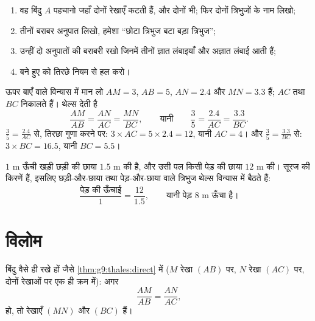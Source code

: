 \begin{method}[थेल्स से कोई लंबाई निकालना]\label{met:g9:thales:compute}
\begin{enumerate}
  \item वह बिंदु $A$ पहचानो जहाँ दोनों रेखाएँ कटती हैं, और दोनों
         भी; फिर दोनों त्रिभुजों के नाम लिखो;
  \item तीनों बराबर अनुपात लिखो, हमेशा ``छोटा त्रिभुज बटा बड़ा
        त्रिभुज'';
  \item उन्हीं दो अनुपातों की बराबरी रखो जिनमें तीनों ज्ञात लंबाइयाँ
        और अज्ञात लंबाई आती हैं;
  \item बने हुए  को तिरछे नियम से हल करो।
\end{enumerate}
\end{method}

\begin{example}\label{ex:g9:thales:compute}
ऊपर बाएँ वाले विन्यास में मान लो $AM = 3$, $AB = 5$, $AN = 2.4$ और
$MN = 3.3$ हैं; $AC$ तथा $BC$ निकालते हैं। थेल्स देती है
\[
\frac{AM}{AB} = \frac{AN}{AC} = \frac{MN}{BC},
\qquad\text{यानी}\qquad
\frac35 = \frac{2.4}{AC} = \frac{3.3}{BC}.
\]
$\frac35 = \frac{2.4}{AC}$ से, तिरछा गुणा करने पर:
$3 \times AC = 5 \times 2.4 = 12$, यानी $AC = 4$। और
$\frac35 = \frac{3.3}{BC}$ से: $3 \times BC = 16.5$, यानी $BC = 5.5$।
\end{example}

\begin{example}[रोज़मर्रा में थेल्स]\label{ex:g9:thales:stick}
$1$ m ऊँची खड़ी छड़ी की छाया $1.5$ m की है, और उसी पल किसी पेड़ की
छाया $12$ m की। सूरज की किरणें  हैं, इसलिए छड़ी-और-छाया तथा
पेड़-और-छाया वाले त्रिभुज थेल्स विन्यास में बैठते हैं:
\[
\frac{\text{पेड़ की ऊँचाई}}{1} = \frac{12}{1.5},
\qquad\text{यानी पेड़ } 8 \text{ m ऊँचा है।}
\]
\end{example}

\section{विलोम}

\begin{theorem}[थेल्स की विलोम]\label{thm:g9:thales:converse}
बिंदु वैसे ही रखे हों जैसे \cref{thm:g9:thales:direct} में ($M$ रेखा
$(AB)$ पर, $N$ रेखा $(AC)$ पर, दोनों रेखाओं पर एक ही क्रम में): अगर
\[
\frac{AM}{AB} = \frac{AN}{AC},
\]
हो, तो रेखाएँ $(MN)$ और $(BC)$  हैं।
\end{theorem}
\admitted

